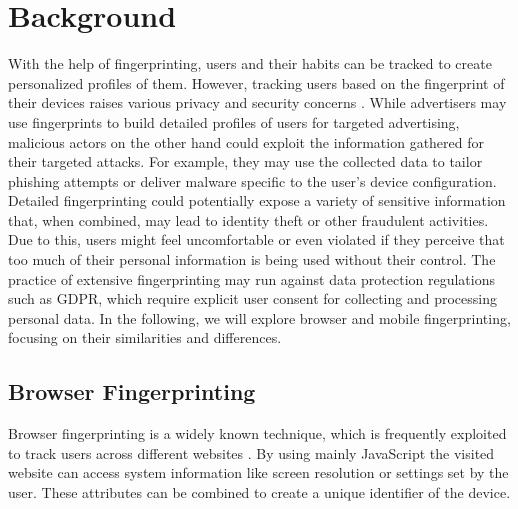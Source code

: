 \documentclass[11pt,
  oneside,openany,    %
]{scrreprt}
\begin{document}
\chapter{Background}
\label{chap:background}
With the help of fingerprinting, users and their habits can be tracked to create personalized profiles of them.
However, tracking users based on the fingerprint of their devices raises various privacy and security concerns \cite{DBLP:conf/ndss/MengZXZZBLTD23}.
While advertisers may use fingerprints to build detailed profiles of users for targeted advertising, malicious actors on the other hand could exploit the information gathered for their targeted attacks. 
For example, they may use the collected data to tailor phishing attempts or deliver malware specific to the user's device configuration.
Detailed fingerprinting could potentially expose a variety of sensitive information that, when combined, may lead to identity theft or other fraudulent activities.
Due to this, users might feel uncomfortable or even violated if they perceive that too much of their personal information is being used without their control.
The practice of extensive fingerprinting may run against data protection regulations such as GDPR, which require explicit user consent for collecting and processing personal data.
In the following, we will explore browser and mobile fingerprinting, focusing on their similarities and differences.

\section{Browser Fingerprinting}
\label{sec:browser_fingerprint}
Browser fingerprinting is a widely known technique, which is frequently exploited to track users across different websites \cite{DBLP:conf/secrypt/PolcakSMHM23}.
By using mainly JavaScript the visited website can access system information like screen resolution or settings set by the user.
These attributes can be combined to create a unique identifier of the device.
\end{document}
